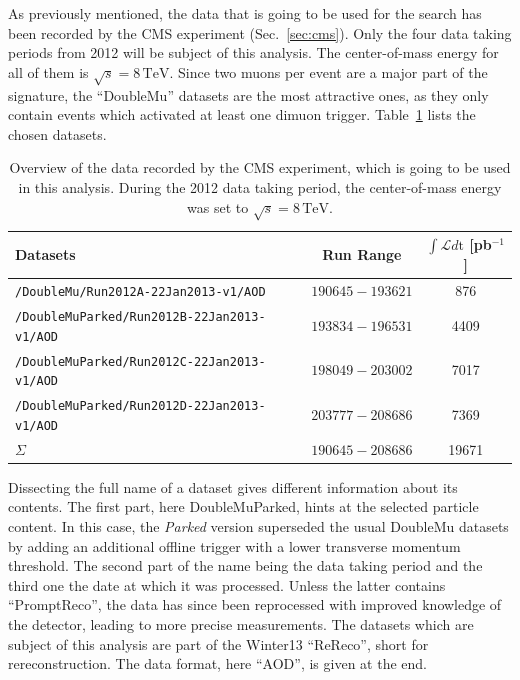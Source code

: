 As previously mentioned, the data that is going to be used for the search has been recorded by the CMS experiment (Sec.~\ref{sec:cms}). Only the four data taking periods from 2012 will be subject of this analysis. The center-of-mass energy for all of them is $\sqrt{s} = 8\,\text{TeV}$. Since two muons per event are a major part of the signature, the ``DoubleMu'' datasets are the most attractive ones, as they only contain events which activated at least one dimuon trigger. Table~\ref{tab:data} lists the chosen datasets.

\begin{table}[!ht]
  \centering
  \begin{tabular}{|l|c|c|}
    \hline
    Datasets                                         & Run Range         & $\int \mathcal{L} d\text{t}$ [pb$^{-1}$] \\ \hline \hline
    \verb+/DoubleMu/Run2012A-22Jan2013-v1/AOD+       & $190645 - 193621$ & 876                            \\ \hline
    \verb+/DoubleMuParked/Run2012B-22Jan2013-v1/AOD+ & $193834 - 196531$ & 4409                           \\ \hline
    \verb+/DoubleMuParked/Run2012C-22Jan2013-v1/AOD+ & $198049 - 203002$ & 7017                           \\ \hline
    \verb+/DoubleMuParked/Run2012D-22Jan2013-v1/AOD+ & $203777 - 208686$ & 7369                           \\ \hline
    $\Sigma$                                         & $190645 - 208686$ & 19671                          \\ \hline
  \end{tabular}
  \caption{Overview of the data recorded by the CMS experiment, which is going to be used in this analysis. During the 2012 data taking period\protect\footnotemark, the center-of-mass energy was set to $\sqrt{s} = 8\,\text{TeV}$.}
  \label{tab:data}
\end{table}


Dissecting the full name of a dataset gives different information about its contents. The first part, here DoubleMuParked, hints at the selected particle content. In this case, the \textit{Parked} version superseded the usual DoubleMu datasets by adding an additional offline trigger with a lower transverse momentum threshold. The second part of the name being the data taking period and the third one the date at which it was processed. Unless the latter contains ``PromptReco'', the data has since been reprocessed with improved knowledge of the detector, leading to more precise measurements. The datasets which are subject of this analysis are part of the Winter13 ``ReReco'', short for rereconstruction. The data format, here ``AOD'', is given at the end.

